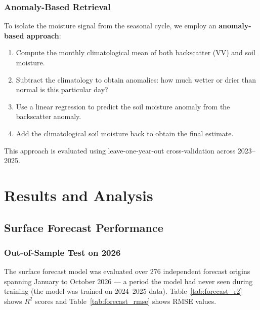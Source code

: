 \documentclass[12pt, a4paper]{article}
\begin{document}
\subsubsection{Anomaly-Based Retrieval}

To isolate the moisture signal from the seasonal cycle, we employ an \textbf{anomaly-based approach}:
\begin{enumerate}
    \item Compute the monthly climatological mean of both backscatter (VV) and soil moisture.
    \item Subtract the climatology to obtain anomalies: how much wetter or drier than normal is this particular day?
    \item Use a linear regression to predict the soil moisture anomaly from the backscatter anomaly.
    \item Add the climatological soil moisture back to obtain the final estimate.
\end{enumerate}

This approach is evaluated using leave-one-year-out cross-validation across 2023--2025.


\section{Results and Analysis}

\subsection{Surface Forecast Performance}

\subsubsection{Out-of-Sample Test on 2026}

The surface forecast model was evaluated over 276 independent forecast origins spanning January to October 2026 --- a period the model had never seen during training (the model was trained on 2024--2025 data). Table~\ref{tab:forecast_r2} shows $R^2$ scores and Table~\ref{tab:forecast_rmse} shows RMSE values.
\end{document}
